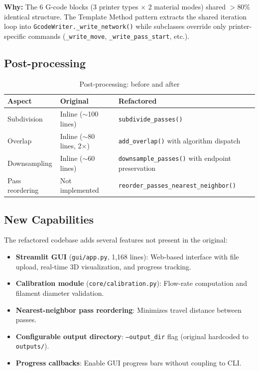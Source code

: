 \documentclass[11pt,a4paper]{article}
\begin{document}
\textbf{Why:} The 6 G-code blocks (3 printer types $\times$ 2 material modes) shared $>$80\% identical structure. The Template Method pattern extracts the shared iteration loop into \texttt{GcodeWriter.\_write\_network()} while subclasses override only printer-specific commands (\texttt{\_write\_move}, \texttt{\_write\_pass\_start}, etc.).

\subsection{Post-processing}

\begin{table}[H]
\centering
\caption{Post-processing: before and after}
\begin{tabularx}{\textwidth}{lXX}
\toprule
\textbf{Aspect} & \textbf{Original} & \textbf{Refactored} \\
\midrule
Subdivision & Inline ($\sim$100 lines) & \texttt{subdivide\_passes()} \\
Overlap & Inline ($\sim$80 lines, 2$\times$) & \texttt{add\_overlap()} with algorithm dispatch \\
Downsampling & Inline ($\sim$60 lines) & \texttt{downsample\_passes()} with endpoint preservation \\
Pass reordering & Not implemented & \texttt{reorder\_passes\_nearest\_neighbor()} \\
\bottomrule
\end{tabularx}
\end{table}

\subsection{New Capabilities}

The refactored codebase adds several features not present in the original:

\begin{itemize}[leftmargin=2em]
    \item \textbf{Streamlit GUI} (\texttt{gui/app.py}, 1,168 lines): Web-based interface with file upload, real-time 3D visualization, and progress tracking.
    \item \textbf{Calibration module} (\texttt{core/calibration.py}): Flow-rate computation and filament diameter validation.
    \item \textbf{Nearest-neighbor pass reordering}: Minimizes travel distance between passes.
    \item \textbf{Configurable output directory}: \texttt{--output\_dir} flag (original hardcoded to \texttt{outputs/}).
    \item \textbf{Progress callbacks}: Enable GUI progress bars without coupling to CLI.
\end{itemize}
\end{document}
